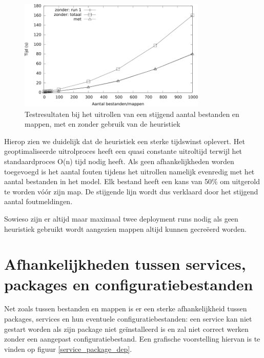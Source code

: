\begin{figure}
    \label{fig:file_dir_times}
    \begin{center}
    \includegraphics[width=0.8\textwidth]{images/file_dir_times.pdf}
    \caption{Testresultaten bij het uitrollen van een stijgend aantal bestanden en mappen, met en zonder gebruik van de heuristiek}
    \end{center}
\end{figure}

Hierop zien we duidelijk dat de heuristiek een sterke tijdswinst oplevert.
Het geoptimaliseerde uitrolproces heeft een quasi constante uitroltijd terwijl het standaardproces O(n) tijd nodig heeft.
Als geen afhankelijkheden worden toegevoegd is het aantal fouten tijdens het uitrollen namelijk evenredig met het aantal bestanden in het model.
Elk bestand heeft een kans van 50\% om uitgerold te worden v\'o\'or zijn map.
De stijgende lijn wordt dus verklaard door het stijgend aantal foutmeldingen.

Sowieso zijn er altijd maar maximaal twee deployment runs nodig als geen heuristiek gebruikt wordt aangezien mappen altijd kunnen gecre\"eerd worden.

\section{Afhankelijkheden tussen services, packages en configuratiebestanden}
\label{services_packages_en_configuratiebestanden}
Net zoals tussen bestanden en mappen is er een sterke afhankelijkheid tussen packages, services en hun eventuele configuratiebestanden:
een service kan niet gestart worden als zijn package niet ge\"installeerd is en zal niet correct werken zonder een aangepast configuratiebestand.
Een grafische voorstelling hiervan is te vinden op figuur \ref{service_package_dep}.

